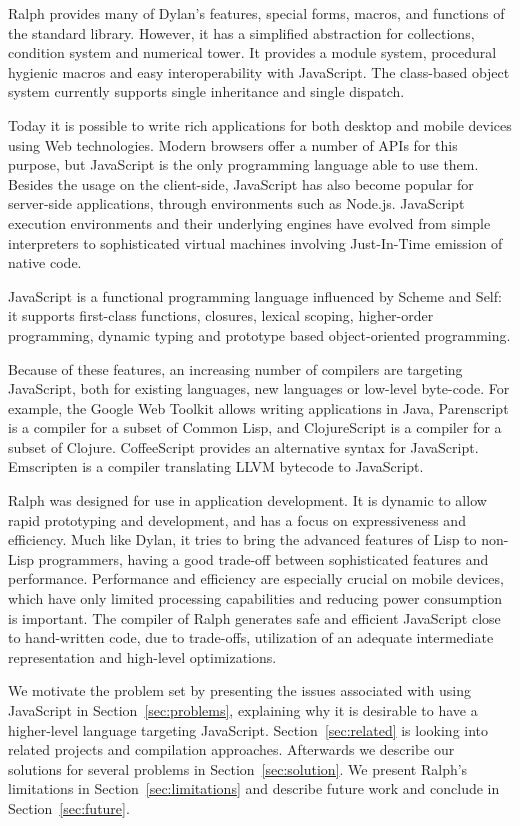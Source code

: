 \documentclass{acm_proc_article-sp}
\begin{document}
Ralph provides many of Dylan's features, special forms, macros, and
functions of the standard library. However, it has a simplified
abstraction for collections, condition system and numerical tower. It
provides a module system, procedural hygienic macros and easy
interoperability with JavaScript. The class-based object system
currently supports single inheritance and single dispatch.

Today it is possible to write rich applications for both desktop and
mobile devices using Web technologies. Modern browsers offer a
number of APIs for this purpose, but JavaScript is the only programming
language able to use them. Besides the usage on the client-side,
JavaScript has also become popular for server-side applications,
through environments such as Node.js. JavaScript execution
environments and their underlying engines have evolved from simple
interpreters to sophisticated virtual machines involving Just-In-Time
emission of native code.

JavaScript is a functional programming language influenced by Scheme
and Self: it supports first-class functions, closures, lexical
scoping, higher-order programming, dynamic typing and prototype based
object-oriented programming.

Because of these features, an increasing number of compilers are
targeting JavaScript, both for existing languages, new languages or
low-level byte-code. For example, the Google Web Toolkit allows
writing applications in Java, Parenscript is a compiler for a subset
of Common Lisp, and ClojureScript is a compiler for a subset of
Clojure. CoffeeScript provides an alternative syntax for JavaScript.
Emscripten is a compiler translating LLVM bytecode to JavaScript.

Ralph was designed for use in application development. It is dynamic
to allow rapid prototyping and development, and has a focus on
expressiveness and efficiency. Much like Dylan, it tries
to bring the advanced features of Lisp to non-Lisp programmers, having
a good trade-off between sophisticated features and
performance. Performance and efficiency are  especially crucial on
mobile devices, which have only limited processing capabilities and
reducing power consumption is important. The compiler of Ralph generates
safe and efficient JavaScript close to hand-written code, due to
trade-offs, utilization of an adequate intermediate representation and
high-level optimizations.

We motivate the problem set by presenting the issues associated with
using JavaScript in Section~\ref{sec:problems}, explaining why it is
desirable to have a higher-level language targeting JavaScript.
Section~\ref{sec:related} is looking into related projects and
compilation approaches. Afterwards we describe our solutions for
several problems in Section~\ref{sec:solution}. We present Ralph's
limitations in Section~\ref{sec:limitations} and describe future work
and conclude in Section~\ref{sec:future}.
\end{document}
